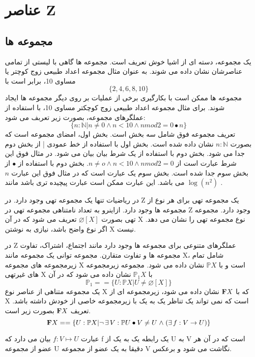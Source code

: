 
\chapter{عناصر Z}\label{chapter3}
\paragraphfootnotes
\section{مجموعه ها}
یک مجموعه، دسته ای از اشیا خوش تعریف است. مجموعه ها گاهی با لیستی از تمامی عناصرشان نشان داده می شوند. به عنوان مثال مجموعه اعداد طبیعی زوج کوچتر یا مساوی 10، برابر است با
 \[
 \{2, 4, 6, 8, 10\}
 \]
مجموعه ها ممکن است با بکارگیری برخی از عملیات بر روی دیگر مجموعه ها ایجاد شوند. برای مثال مجموعه اعداد طبیعی زوج کوچکتر مساوی 10، با استفاده از عملگرهای مجموعه، بصورت زیر تعربف می شود:
\[
\{n:\mathbb{N}|n\ne0 \land n<10 \land  n  mod  2=0 \bullet n\}
\]
تعریف مجموعه فوق شامل سه بخش است. بخش اول، امضای مجموعه است که بصورت $n:\mathbb{N}$
 نشان داده شده است. بخش اول با استفاده از خط عمودی | از بخش دوم جدا می شود. بخش دوم با استفاده از یک شرط بیان بیان می شود. در مثال فوق این شرط عبارت است از 
 $n\ne o \land n<10 \land n mod 2=0 $.
 بخش دوم با استفاده از 
 $\bullet $
  از بخش سوم جدا شده است. بخش سوم یک عبارت است که در مثال فوق این عبارت $n$ می باشد. این عبارت ممکن است عبارت پیچیده تری باشد مانند 
 $\log (n^2)$ .
 
 در ریاضیات تنها یک مجموعه تهی وجود دارد. در Z یک مجموعه تهی برای هر نوع از مجموعه ها وجود دارد. ازاینرو به تعداد نامتناهی مجموعه تهی در Z وجود دارد. مجموعه تهی بصورت 
 $\varnothing [X]$
  تعریف می شود که در آن X نوع مجموعه تهی را نشان می دهد. اگر نوع واضح باشد، نیازی به نوشتن X نیست.
 
 در Z عملگرهای متنوعی برای مجموعه ها وجود دارد مانند اجتماع، اشتراک، تفاوت مجموعه ها و تفاوت متقارن. مجموعه توانی یک مجموعه مانند X، شامل تمام زیرمجموعه های مجموعه X است و با 
 $\mathbb{P}X$
 نشان داده می شود. مجموعه زیرمجموعه های غیرتهی X با 
 $\mathbb{P}_1 X$
 نشان داده می شود که در آن
 \[
 \mathbb{P}_1 ==\{ U: \mathbb{P} X|U\neq \varnothing[X]\}
 \]
 یک مجموعه متناهی از عناصر نوع X که با 
 $\bold F X$
 نشان داده می شود، زیرمجموعه ای از X است که نمی تواند یک تناظر یک به یک با زیرمجموعه خاصی از خودش داشته باشد. تعریف 
 $\bold F X$
 بصورت زیر است.
 \[
 \bold F X== \{ U:\mathbb{P}X| \neg \exists V : \mathbb{P} U \bullet V \neq U \land ( \exists f:V \to U)\}
\] 

عبارت
 $f:V\longmapsto U $
 بیان می دارد که f یک رابطه یک به یک از U به V است که در آن هر عضو از مجموعه U دقیقا به یک عضو از مجموعه V نگاشت می شود و برعکس.
 
